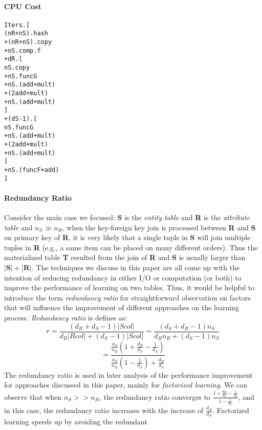 \documentclass{vldb}
\begin{document}
\paragraph*{CPU Cost}
\vspace{-2mm}
\begin{alltt}
Iters.[ 
  (nR+nS).hash 
   +(nR + nS).copy 
   +nS.comp.f 
   +dR.[                 
         nS.copy
       + nS.funcG       
       + nS.(add+mult) 
       + (2add+mult)
       + nS.(add+mult)  
     ]   
     + (dS-1).[             
         nS.funcG
       + nS.(add+mult)
       + (2add+mult)
       + nS.(add+mult)
      ]
       + nS.(funcF + add)                  
]    
\end{alltt} 

\paragraph*{Redundancy Ratio}
Consider the main case we focused: \textbf{S} is the \textit{entity table} and \textbf{R}  is the \textit{attribute table} and $n_S \gg n_R$,  when the key-foreign key join is processed between \textbf{R} and \textbf{S} on primary key of \textbf{R}, it is very likely that a single tuple in \textbf{S} will join multiple tuples in \textbf{R} (e.g., a same item can be placed on many different orders).  Thus the materialized table \textbf{T} resulted from the join of \textbf{R} and \textbf{S} is usually larger than $|\textbf{S}| + |\textbf{R}|$. The techniques we discuss in this paper are all come up with the intention of reducing redundancy in either I/O or computation (or both) to improve the performance of learning on two tables. Thus, it would be helpful to introduce the term \textit {redundancy ratio} for straightforward observation on factors that will influence the improvement of different approaches on the learning process. \textit{Redundancy ratio} is defines as:
$$r = \frac{(d_R+d_S-1)|Scol|}{d_R|Rcol|+(d_S-1)|Scol|} = \frac{(d_S+d_R-1)n_S}{d_Rn_R+(d_S-1)n_S}$$
$$=\frac{\frac{n_S}{n_R}(1+\frac{d_R}{d_S}-\frac{1}{d_S})}{\frac{n_S}{n_R}(1-\frac{1}{d_S})+\frac{d_R}{d_S}}$$
The redundancy ratio is used in later analysis of the performance improvement for approaches discussed in this paper, mainly for \textit{factorized learning}. We can observe that when $n_S >> n_R$, the redundancy ratio converges to $\frac{1+\frac{d_R}{d_S}-\frac{1}{d_S}}{1-\frac{1}{d_S}}$,
and in this case, the redundancy ratio increases with the increase of $\frac{d_R}{d_S}$. Factorized learning speeds up by avoiding the redundant
\end{document}
